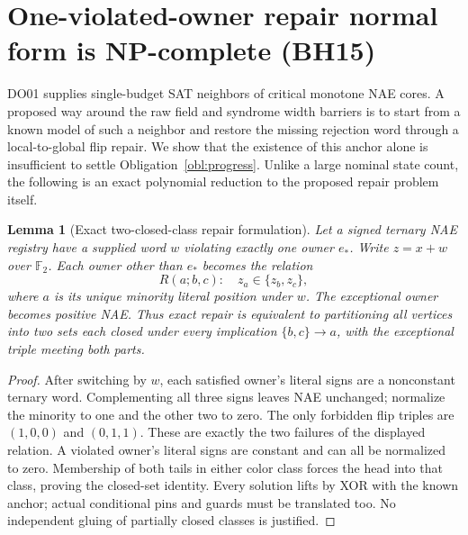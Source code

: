 \documentclass[11pt]{article}
\newtheorem{lemma}[theorem]{Lemma}
\begin{document}
\section{One-violated-owner repair normal form is NP-complete (BH15)}\label{sec:bh15}
DO01 supplies single-budget SAT neighbors of critical monotone NAE cores. A proposed way around the raw field and syndrome width barriers is to start from a known model of such a neighbor and restore the missing rejection word through a local-to-global flip repair. We show that the existence of this anchor alone is insufficient to settle Obligation~\ref{obl:progress}. Unlike a large nominal state count, the following is an exact polynomial reduction to the proposed repair problem itself.
\begin{lemma}[Exact two-closed-class repair formulation]\label{lem:bh15-flip}
Let a signed ternary NAE registry have a supplied word $w$ violating exactly one owner $e_*$. Write $z=x+w$ over $\mathbb F_2$. Each owner other than $e_*$ becomes the relation
\[
R(a;b,c):\quad z_a\in\{z_b,z_c\},
\]
where $a$ is its unique minority literal position under $w$. The exceptional owner becomes positive NAE. Thus exact repair is equivalent to partitioning all vertices into two sets each closed under every implication $\{b,c\}\to a$, with the exceptional triple meeting both parts.
\end{lemma}
\begin{proof}
After switching by $w$, each satisfied owner's literal signs are a nonconstant ternary word. Complementing all three signs leaves NAE unchanged; normalize the minority to one and the other two to zero. The only forbidden flip triples are $(1,0,0)$ and $(0,1,1)$. These are exactly the two failures of the displayed relation. A violated owner's literal signs are constant and can all be normalized to zero. Membership of both tails in either color class forces the head into that class, proving the closed-set identity. Every solution lifts by XOR with the known anchor; actual conditional pins and guards must be translated too. No independent gluing of partially closed classes is justified.
\end{proof}
\end{document}

